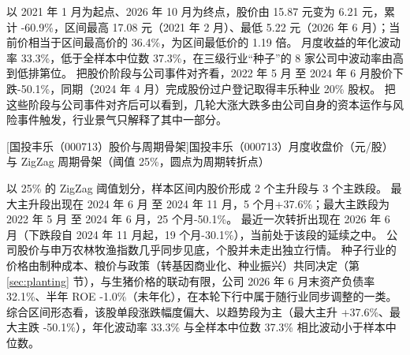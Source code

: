  以 2021 年 1 月为起点、2026 年 10 月为终点，股价由 15.87 元变为 6.21 元，累计 -60.9\%，区间最高 17.08 元（2021 年 2 月）、最低 5.22 元（2026 年 6 月）；当前价相当于区间最高价的 36.4\%，为区间最低价的 1.19 倍。 月度收益的年化波动率 33.3\%，低于全样本中位数 37.3\%，在三级行业“种子”的 8 家公司中波动率由高到低排第位。 把股价阶段与公司事件对齐看，2022 年 5 月 至 2024 年 6 月股价下跌-50.1\%，同期（2024 年 4 月）完成股份过户登记取得丰乐种业 20\% 股权。 把这些阶段与公司事件对齐后可以看到，几轮大涨大跌多由公司自身的资本运作与风险事件触发，行业景气只解释了其中一部分。

\begin{center}
\begin{minipage}{\textwidth}\centering
{}

[国投丰乐（000713）股价与周期骨架]{国投丰乐（000713）月度收盘价（元/股）与 ZigZag 周期骨架（阈值 25\%，圆点为周期转折点）}
\end{minipage}
\end{center}

 以 25\% 的 ZigZag 阈值划分，样本区间内股价形成 2 个主升段与 3 个主跌段。 最大主升段出现在 2024 年 6 月 至 2024 年 11 月，5 个月+37.6\%；最大主跌段为 2022 年 5 月 至 2024 年 6 月，25 个月-50.1\%。 最近一次转折出现在 2026 年 6 月（下跌段自 2024 年 11 月起，19 个月-30.1\%），当前处于该段的延续之中。 公司股价与申万农林牧渔指数几乎同步见底，个股并未走出独立行情。 种子行业的价格由制种成本、粮价与政策（转基因商业化、种业振兴）共同决定（第 \ref{sec:planting} 节），与生猪价格的联动有限，公司 2026 年 6 月末资产负债率 32.1\%、半年 ROE -1.0\%（未年化），在本轮下行中属于随行业同步调整的一类。 综合区间形态看，该股单段涨跌幅度偏大、以趋势段为主（最大主升 +37.6\%、最大主跌 -50.1\%），年化波动率 33.3\% 与全样本中位数 37.3\% 相比波动小于样本中位数。

